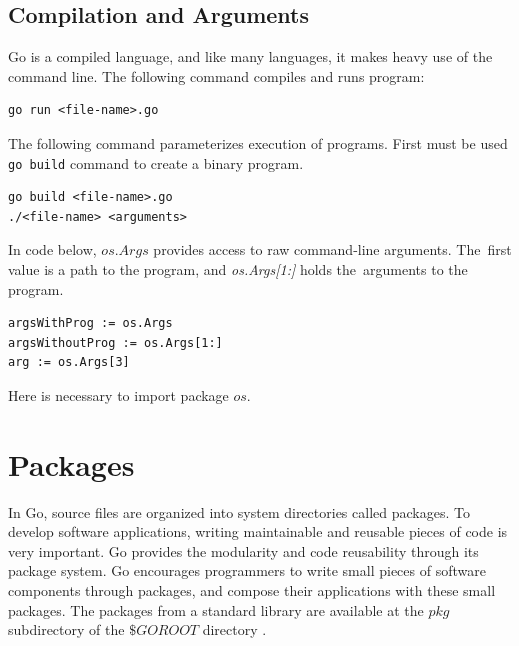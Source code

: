 \documentclass[
  12pt, 
  digital, %
  notable,   %
  nolof,     %
  nolot,     %
]{fithesis3}
\begin{document}
\subsection{Compilation and Arguments}
Go is a compiled language, and like many languages, it makes heavy use of the command line. The following command compiles and runs program:
\begin{lstlisting}
go run <file-name>.go
\end{lstlisting}
The following command parameterizes execution of programs. First must be used \texttt{go build} command to create a binary program.
\begin{lstlisting}
go build <file-name>.go
./<file-name> <arguments>
\end{lstlisting}
In code below, $os.Args$ provides access to raw command-line arguments. The~first value is a path to the program, and \textit{os.Args[1:]} holds the~arguments to the program.
\begin{lstlisting}
argsWithProg := os.Args
argsWithoutProg := os.Args[1:]
arg := os.Args[3]
\end{lstlisting}
Here is necessary to import package $os$.

\section{Packages}
In Go, source files are organized into system directories called packages. To  develop 
software applications, writing maintainable and reusable pieces of code is very important. Go 
provides the modularity and code reusability through its package system. Go encourages 
programmers to write small pieces of software components through packages, and compose their  
applications with these small packages. The packages from a standard library are available at the $pkg$ subdirectory of the $\$GOROOT$ directory \cite{stack_2014}.
\end{document}
